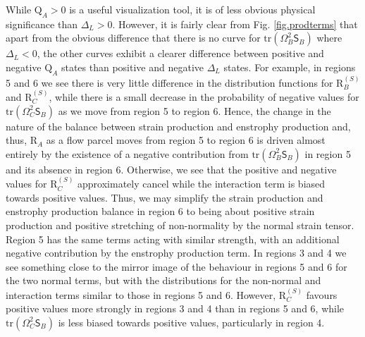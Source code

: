 \documentclass[preprint,amssymb,amsmath,aip,cha]{revtex4-1}
\begin{document}
While $\mbox{Q}_{A} > 0$ is a useful visualization tool, it is of less obvious physical significance than $\Delta_{L} > 0$. However, it is fairly clear from Fig. \ref{fig.prodterms} that apart from the obvious difference that there is no curve for $\mbox{tr}(\mathsf{\Omega}^{2}_{B}\mathsf{S}_{B})$ where $\Delta_{L} < 0$, the other curves exhibit a clearer difference between positive and negative $\mbox{Q}_{A}$ states than positive and negative $\Delta_{L}$ states. For example, in regions 5 and 6 we see there is very little difference in the distribution functions for $\mbox{R}_{B}^{(S)}$ and $\mbox{R}_{C}^{(S)}$, while there is a small decrease in the probability of negative values for $\mbox{tr}(\mathsf{\Omega}^{2}_{C}\mathsf{S}_{B})$ as we move from region 5 to region 6. Hence, the change in the nature of the balance between strain production and enstrophy production and, thus, $\mbox{R}_{A}$ as a flow parcel moves from region 5 to region 6 is driven almost entirely by the existence of a negative contribution from $\mbox{tr}(\mathsf{\Omega}^{2}_{B}\mathsf{S}_{B})$ in region 5 and its absence in region 6. Otherwise, we see that the positive and negative values for $\mbox{R}_{C}^{(S)}$ approximately cancel while the interaction term is biased towards positive values. Thus, we may simplify the strain production and enstrophy production balance in region 6 to being about positive strain production and positive stretching of non-normality by the normal strain tensor. Region 5 has the same terms acting with similar strength, with an additional negative contribution by the enstrophy production term. In regions 3 and 4 we see something close to the mirror image of the behaviour in regions 5 and 6 for the two normal terms, but with the distributions for the non-normal and interaction terms similar to those in regions 5 and 6. However, $\mbox{R}_{C}^{(S)}$ favours positive values more strongly in regions 3 and 4 than in regions 5 and 6, while $\mbox{tr}(\mathsf{\Omega}^{2}_{C}\mathsf{S}_{B})$ is less biased towards positive values, particularly in region 4. 
\end{document}
